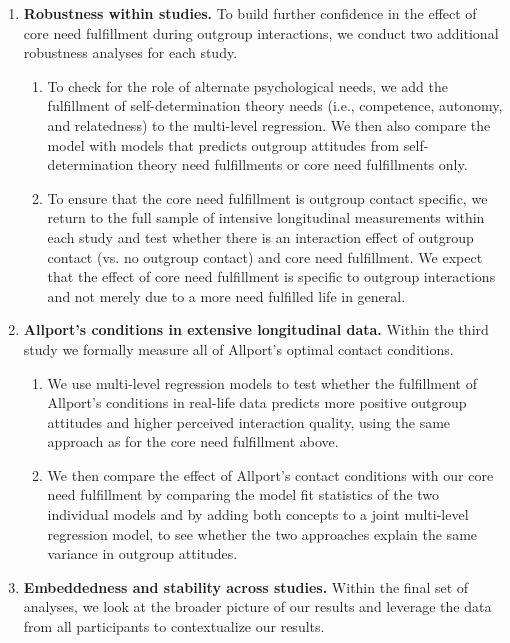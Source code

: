 \documentclass[man, 12pt, a4paper, mask]{apa7}
\theoremstyle{break}
\theoremstyle{plain}
\begin{document}
\begin{enumerate}
\begin{enumerate}
    \end{enumerate}
    \item \textbf{Robustness within studies.} To build further confidence in the effect of core need fulfillment during outgroup interactions, we conduct two additional robustness analyses for each study. 
    \begin{enumerate}
        \item To check for the role of alternate psychological needs, we add the fulfillment of self-determination theory needs (i.e., competence, autonomy, and relatedness) to the multi-level regression. We then also compare the model with models that predicts outgroup attitudes from self-determination theory need fulfillments or core need fulfillments only. 
        \item To ensure that the core need fulfillment is outgroup contact specific, we return to the full sample of intensive longitudinal measurements within each study and test whether there is an interaction effect of outgroup contact (vs. no outgroup contact) and core need fulfillment. We expect that the effect of core need fulfillment is specific to outgroup interactions and not merely due to a more need fulfilled life in general.
    \end{enumerate} 
    \item \textbf{Allport's conditions in extensive longitudinal data.} Within the third study we formally measure all of Allport's optimal contact conditions. 
    \begin{enumerate}
        \item We use multi-level regression models to test whether the fulfillment of Allport's conditions in real-life data predicts more positive outgroup attitudes and higher perceived interaction quality, using the same approach as for the core need fulfillment above.
        \item We then compare the effect of Allport's contact conditions with our core need fulfillment by comparing the model fit statistics of the two individual models and by adding both concepts to a joint multi-level regression model, to see whether the two approaches explain the same variance in outgroup attitudes.
    \end{enumerate}
    \item \textbf{Embeddedness and stability across studies.} Within the final set of analyses, we look at the broader picture of our results and leverage the data from all participants to contextualize our results.  
    \begin{enumerate}

\end{enumerate}
\end{enumerate}
\end{document}
